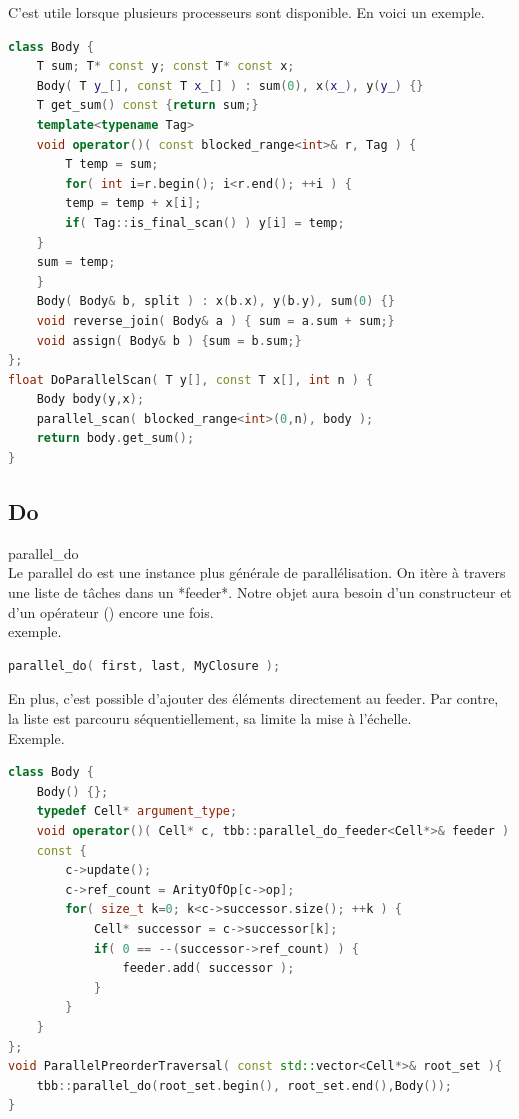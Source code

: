 \documentclass[oneside]{book}
\begin{document}
C'est utile lorsque plusieurs processeurs sont disponible. En voici un exemple.\\

\begin{lstlisting}[language=c++]
class Body {
	T sum; T* const y; const T* const x;
	Body( T y_[], const T x_[] ) : sum(0), x(x_), y(y_) {}
	T get_sum() const {return sum;}
	template<typename Tag>
	void operator()( const blocked_range<int>& r, Tag ) {
		T temp = sum;
		for( int i=r.begin(); i<r.end(); ++i ) {
		temp = temp + x[i];
		if( Tag::is_final_scan() ) y[i] = temp;
	}
	sum = temp;
	}
	Body( Body& b, split ) : x(b.x), y(b.y), sum(0) {}
	void reverse_join( Body& a ) { sum = a.sum + sum;}
	void assign( Body& b ) {sum = b.sum;}
};
float DoParallelScan( T y[], const T x[], int n ) {
	Body body(y,x);
	parallel_scan( blocked_range<int>(0,n), body );
	return body.get_sum();
}
\end{lstlisting}
\subsection{Do} parallel\_do\\
Le parallel do est une instance plus générale de parallélisation. On itère à travers une liste de tâches dans un *feeder*. Notre objet aura besoin d'un constructeur et d'un opérateur () encore une fois.\\

exemple. 
\begin{lstlisting}[language=c++]
parallel_do( first, last, MyClosure );
\end{lstlisting}
En plus, c'est possible d'ajouter des éléments directement au feeder. Par contre, la liste est parcouru séquentiellement, sa limite la mise à l'échelle.\\

Exemple.
\begin{lstlisting}[language=c++]
class Body {
	Body() {};
	typedef Cell* argument_type;
	void operator()( Cell* c, tbb::parallel_do_feeder<Cell*>& feeder )
	const {
		c->update();
		c->ref_count = ArityOfOp[c->op];
		for( size_t k=0; k<c->successor.size(); ++k ) {
			Cell* successor = c->successor[k];
			if( 0 == --(successor->ref_count) ) {
				feeder.add( successor );
			}
		}
	}
};
void ParallelPreorderTraversal( const std::vector<Cell*>& root_set ){
	tbb::parallel_do(root_set.begin(), root_set.end(),Body());
}
\end{lstlisting}
\end{document}
